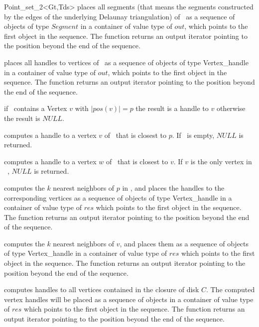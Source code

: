 \begin{ccRefClass}{Point_set_2<Gt,Tds>}
{ places all segments (that means the segments constructed by the edges of the underlying
Delaunay triangulation)
of \ccVar\ as a sequence of objects of type
$Segment$ in a container of value type of $out$,
which points to the first object in the sequence. The function
returns an output iterator pointing to the position beyond the end
of the sequence.} 

\ccHtmlLinksOff

{ places all handles to vertices of \ccVar\ as a sequence of objects of type
Vertex\_handle in a container of value type of $out$,
which points to the first object in the sequence. The function
returns an output iterator pointing to the position beyond the end
of the sequence.} 


{ if \ccVar\ contains a Vertex $v$ with $|pos(v)| = p$ 
the result is a handle to $v$ otherwise the result is $NULL$. }


{ computes a handle to a vertex $v$ of \ccVar\ that is closest to $p$.
If \ccVar\ is empty, $NULL$ is returned.
}

{ computes a handle to a vertex $w$ of \ccVar\ that is closest to $v$.
If $v$ is the only vertex in \ccVar\ , $NULL$ is returned.
}

{ computes the $k$ nearest neighbors of $p$ in \ccVar, and places the
handles to the corresponding vertices as a sequence of objects of type
Vertex\_handle in a container of value type of $res$
which points to the first object in the sequence. The function
returns an output iterator pointing to the position beyond the end
of the sequence. }

{ computes the $k$ nearest neighbors of $v$, and places them as a sequence of objects of type
Vertex\_handle in a container of value type of $res$
which points to the first object in the sequence. The function
returns an output iterator pointing to the position beyond the end
of the sequence. }

{ computes handles to all vertices contained in the closure of disk $C$.
The computed vertex handles will be placed as a sequence of objects in a container of value type
of $res$
which points to the first object in the sequence. The function
returns an output iterator pointing to the position beyond the end
of the sequence.
}


\end{ccRefClass}
